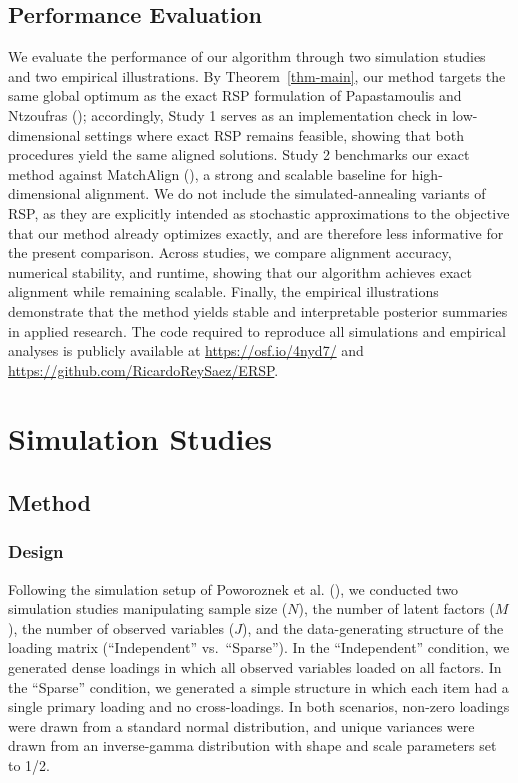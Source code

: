 \documentclass[
  man,
  longtable,
  nolmodern,
  notxfonts,
  notimes,
  colorlinks=true,linkcolor=blue,citecolor=blue,urlcolor=blue]{apa7}
\theoremstyle{plain}
\theoremstyle{plain}
\theoremstyle{remark}
\begin{document}
\subsection{Performance Evaluation}\label{performance-evaluation}

We evaluate the performance of our algorithm through two simulation
studies and two empirical illustrations. By Theorem~\ref{thm-main}, our
method targets the same global optimum as the exact RSP formulation of
Papastamoulis and Ntzoufras
(); accordingly,
Study 1 serves as an implementation check in low-dimensional settings
where exact RSP remains feasible, showing that both procedures yield the
same aligned solutions. Study 2 benchmarks our exact method against
MatchAlign (), a
strong and scalable baseline for high-dimensional alignment. We do not
include the simulated-annealing variants of RSP, as they are explicitly
intended as stochastic approximations to the objective that our method
already optimizes exactly, and are therefore less informative for the
present comparison. Across studies, we compare alignment accuracy,
numerical stability, and runtime, showing that our algorithm achieves
exact alignment while remaining scalable. Finally, the empirical
illustrations demonstrate that the method yields stable and
interpretable posterior summaries in applied research. The code required
to reproduce all simulations and empirical analyses is publicly
available at \url{https://osf.io/4nyd7/} and
\url{https://github.com/RicardoReySaez/ERSP}.

\section{Simulation Studies}\label{simulation-studies}

\subsection{Method}\label{method}

\subsubsection{Design}\label{design}

Following the simulation setup of Poworoznek et al.
(), we conducted two simulation
studies manipulating sample size (\(N\)), the number of latent factors
(\(M\)), the number of observed variables (\(J\)), and the
data-generating structure of the loading matrix (``Independent''
vs.~``Sparse''). In the ``Independent'' condition, we generated dense
loadings in which all observed variables loaded on all factors. In the
``Sparse'' condition, we generated a simple structure in which each item
had a single primary loading and no cross-loadings. In both scenarios,
non-zero loadings were drawn from a standard normal distribution, and
unique variances were drawn from an inverse-gamma distribution with
shape and scale parameters set to 1/2.
\end{document}
